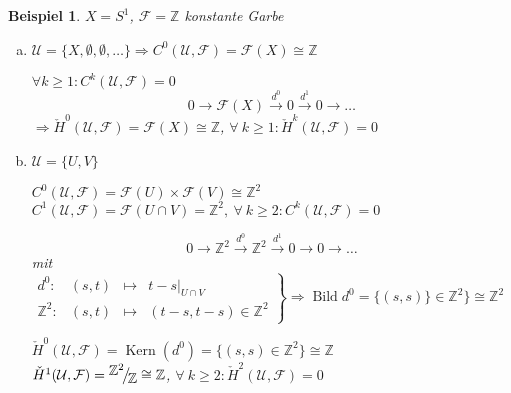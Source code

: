 \documentclass[paper = A4, fontsize=12pt, numbers=noendperiod, chapterprefix=true]{scrbook}
\theoremstyle{break}
\newtheorem{Bsp}[Def]{Beispiel}
\theoremstyle{nonumberbreak}
\theoremstyle{nonumberplain}
\DeclareMathOperator{\Bild}{Bild}
\DeclareMathOperator{\Kern}{Kern}
\newcommand{\Z}{\mathbb{Z}}
\newcommand{\calF}{\mathcal{F}}
\newcommand{\calU}{\mathcal{U}}
\newcommand{\X}{\times}
\newcommand{\FakRaum}[2]{
	\raisebox{0.7ex}{\ensuremath{#1}}
	\ensuremath{\mkern-3mu}\big/\ensuremath{\mkern-3mu}
	\raisebox{-0.6ex}{\ensuremath{#2}}}
\begin{document}
\begin{Bsp}
$X = S^1$, $\calF = \Z$ konstante Garbe
\begin{enumerate}[a)]
\item
	$\calU = \{X, \emptyset, \emptyset,\ldots\} \Rightarrow C^0(\calU, \calF) = \calF(X) \cong \Z$
	
	$\forall k \ge 1: C^k(\calU, \calF) = 0$
		\[ 0 \to \calF(X) \xrightarrow{d^0} 0 \xrightarrow{d^1} 0 \to \ldots \]
	$\Rightarrow \check{H}^0(\calU, \calF) = \calF(X) \cong \Z$, $\forall \ k \ge 1: \check{H}^k(\calU, \calF) = 0$
\item
	$\calU = \{U, V\}$
	
	\begin{minipage}{10cm}
	$C^0( \calU, \calF) = \calF(U) \X \calF(V) \cong \Z^2$\\
	$C^1(\calU, \calF) = \calF(U \cap V) = \Z^2, \ \forall \ k \ge 2: C^k(\calU, \calF) = 0$\end{minipage}
	\begin{minipage}{5cm}\end{minipage}
		\[ 0 \to \Z^2 \xrightarrow{d^0} \Z^2 \xrightarrow{d^1} 0 \to 0 \to \ldots \]
	mit $\left.\begin{array}{crcl} d^0:& (s,t) &\mapsto& t-s|_{U \cap V} \\
		\Z^2:& (s,t) &\mapsto& (t-s, t-s) \in \Z^2 \end{array}\right\} \Rightarrow \Bild d^0 = \{(s,s)\} \in \Z^2\} \cong \Z^2$
	
	$\check{H}^0(\calU, \calF) = \Kern(d^0) = \{(s,s) \in \Z^2\} \cong \Z$\\
	$\check{H}^1(\calU, \calF) = \FakRaum{\Z^2}{\Z} \cong \Z$, $\forall \ k \ge 2: \check{H}^2(\calU, \calF) = 0$
\end{enumerate}\end{Bsp}
\end{document}
